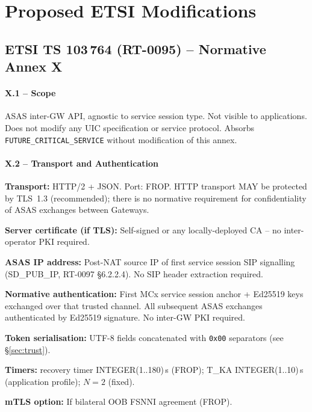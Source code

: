 \documentclass[11pt,a4paper]{article}
\begin{document}
\section{Proposed ETSI Modifications}

\subsection{ETSI TS 103\,764 (RT-0095) -- Normative Annex X}

\paragraph{X.1 -- Scope}
\label{x1}
ASAS inter-GW API, agnostic to service session type. Not visible to applications.
Does not modify any UIC specification or service protocol. Absorbs
\texttt{FUTURE\_CRITICAL\_SERVICE} without modification of this annex.

\paragraph{X.2 -- Transport and Authentication}
\label{x2}
\textbf{Transport:} HTTP/2 + JSON. Port: FROP. HTTP transport MAY be protected by
TLS~1.3 (recommended); there is no normative requirement for confidentiality of ASAS
exchanges between Gateways.

\textbf{Server certificate (if TLS):} Self-signed or any locally-deployed CA --
no inter-operator PKI required.

\textbf{ASAS IP address:} Post-NAT source IP of first service session SIP signalling
(SD\_PUB\_IP, RT-0097 §6.2.2.4). No SIP header extraction required.

\textbf{Normative authentication:} First MCx service session anchor + Ed25519 keys
exchanged over that trusted channel. All subsequent ASAS exchanges authenticated by
Ed25519 signature. No inter-GW PKI required.

\textbf{Token serialisation:} UTF-8 fields concatenated with \texttt{0x00}
separators (see §\ref{sec:trust}).

\textbf{Timers:} recovery timer INTEGER(1..180)\,s (FROP);
T\_KA INTEGER(1..10)\,s (application profile); $N = 2$ (fixed).

\textbf{mTLS option:} If bilateral OOB FSNNI agreement (FROP).
\end{document}

